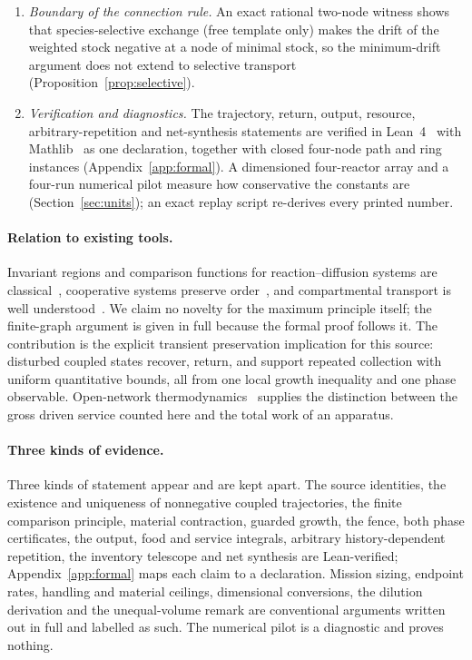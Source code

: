 \documentclass[11pt,a4paper]{article}
\theoremstyle{plain}
\theoremstyle{definition}
\theoremstyle{remark}
\begin{document}
\begin{enumerate}[label=(\roman*)]
\item \emph{Boundary of the connection rule.} An exact rational two-node witness shows that species-selective exchange (free template only) makes the drift of the weighted stock negative at a node of minimal stock, so the minimum-drift argument does not extend to selective transport (Proposition~\ref{prop:selective}).
\item \emph{Verification and diagnostics.} The trajectory, return, output, resource, arbitrary-repetition and net-synthesis statements are verified in Lean~4~\citep{demoura2021} with Mathlib~\citep{mathlib2020} as one declaration, together with closed four-node path and ring instances (Appendix~\ref{app:formal}). A dimensioned four-reactor array and a four-run numerical pilot measure how conservative the constants are (Section~\ref{sec:units}); an exact replay script re-derives every printed number.
\end{enumerate}

\paragraph{Relation to existing tools.}
Invariant regions and comparison functions for reaction--diffusion systems are classical~\citep{chueh1977,walter1970}, cooperative systems preserve order~\citep{hirsch2005}, and compartmental transport is well understood~\citep{jacquez1993}. We claim no novelty for the maximum principle itself; the finite-graph argument is given in full because the formal proof follows it. The contribution is the explicit transient preservation implication for this source: disturbed coupled states recover, return, and support repeated collection with uniform quantitative bounds, all from one local growth inequality and one phase observable. Open-network thermodynamics~\citep{polettini2014,rao2016} supplies the distinction between the gross driven service counted here and the total work of an apparatus.

\paragraph{Three kinds of evidence.}
Three kinds of statement appear and are kept apart. The source identities, the existence and uniqueness of nonnegative coupled trajectories, the finite comparison principle, material contraction, guarded growth, the fence, both phase certificates, the output, food and service integrals, arbitrary history-dependent repetition, the inventory telescope and net synthesis are Lean-verified; Appendix~\ref{app:formal} maps each claim to a declaration. Mission sizing, endpoint rates, handling and material ceilings, dimensional conversions, the dilution derivation and the unequal-volume remark are conventional arguments written out in full and labelled as such. The numerical pilot is a diagnostic and proves nothing.
\end{document}

